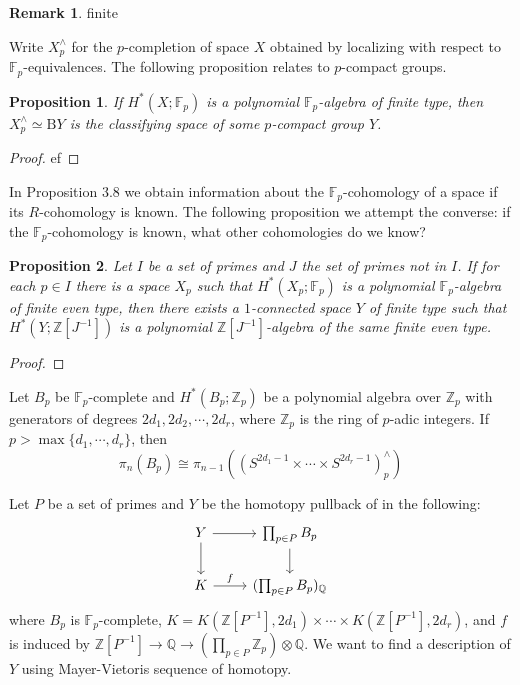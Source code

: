 \documentclass[psamsfonts]{amsart}
\newtheorem{prop}{Proposition}[section]
\theoremstyle{definition}
\newtheorem{rem}{Remark}[section]
\newcommand{\Q}{\mathbb{Q}}
\newcommand{\Z}{\mathbb{Z}}
\newcommand{\F}{\mathbb{F}}
\newcommand{\B}{\mathrm{B}}
\numberwithin{equation}{section}
\begin{document}
\begin{rem}
finite
\end{rem}

Write $X_p^\wedge$ for the $p$-completion of space $X$ obtained by localizing with respect to $\F_p$-equivalences. The following proposition relates to $p$-compact groups.

\begin{prop}
If $H^\ast(X;\F_p)$ is a polynomial $\F_p$-algebra  of finite type, then $X_p^\wedge\simeq\B Y$ is the classifying space of some $p$-compact group $Y$.
\end{prop}
\begin{proof}
ef
\end{proof}

In Proposition 3.8 we obtain information about the $\F_p$-cohomology of a space if its $R$-cohomology is known. The following proposition we attempt the converse: if the $\F_p$-cohomology is known, what other cohomologies do we know?

\begin{prop}
Let $I$ be a set of primes and $J$ the set of primes not in $I$. If for each $p\in I$ there is a space $X_p$ such that $H^\ast(X_p;\F_p)$ is a polynomial $\F_p$-algebra of finite even type, then there exists a $1$-connected space $Y$ of finite type such that $H^\ast(Y;\Z[J^{-1}])$ is a polynomial $\Z[J^{-1}]$-algebra of the same finite even type.
\end{prop}
\begin{proof}

\end{proof}

Let $B_p$ be $\F_p$-complete and $H^\ast(B_p;\Z_p)$ be a polynomial algebra over $\Z_p$ with generators of degrees $2d_1,2d_2,\cdots,2d_r$, where $\Z_p$ is the ring of $p$-adic integers. If $p>\max\{d_1,\cdots,d_r\}$, then
\[\pi_n(B_p)\cong\pi_{n-1}\left((S^{2d_1-1}\times\cdots\times S^{2d_r-1})_p^\wedge\right)\]\medbreak

\noindent Let $P$ be a set of primes and $Y$ be the homotopy pullback of in the following:
\[\begin{tikzcd}
Y\arrow[r]\arrow[d]&\prod_{p\in P}B_p\arrow[d]\\
K\arrow[r,"f"]&(\prod_{p\in P}B_p)_\Q
\end{tikzcd}\]
where $B_p$ is $\F_p$-complete, $K=K(\Z[P^{-1}],2d_1)\times\cdots\times K(\Z[P^{-1}],2d_r)$, and $f$ is induced by $\Z[P^{-1}]\to\Q\to(\prod_{p\in P}\Z_p)\otimes\Q$. We want to find a description of $Y$ using Mayer-Vietoris sequence of homotopy.\medbreak
\end{document}
